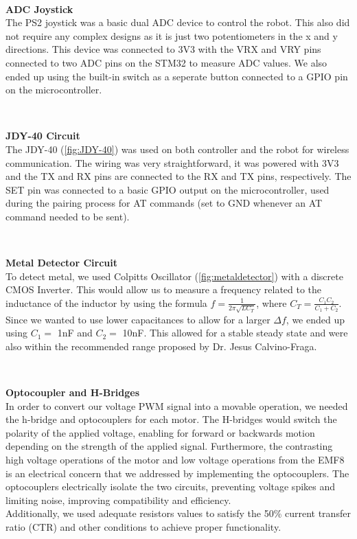\documentclass{article}
\begin{document}
\

\textbf{ADC Joystick} \\
The PS2 joystick was a basic dual ADC device to control the robot. This also did not require any complex designs as it is just two potentiometers in the x and y directions. This device was connected to 3V3 with the VRX and VRY pins connected to two ADC pins on the STM32 to measure ADC values. We also ended up using the built-in switch as a seperate button connected to a GPIO pin on the microcontroller.

\

\textbf{JDY-40 Circuit} \\
The JDY-40 (\ref{fig:JDY-40}) was used on both controller and the robot for wireless communication. The wiring was very straightforward, it was powered with 3V3 and the TX and RX pins are connected to the RX and TX pins, respectively. The SET pin was connected to a basic GPIO output on the microcontroller, used during the pairing process for AT commands (set to GND whenever an AT command needed to be sent).

\

\textbf{Metal Detector Circuit} \\
To detect metal, we used Colpitts Oscillator (\ref{fig:metaldetector}) with a discrete CMOS Inverter. This would allow us to measure a frequency related to the inductance of the inductor by using the formula $f = \frac{1}{2 \pi \sqrt{LC_T}}$, where $C_T = \frac{C_1C_2}{C_1+C_2}$. Since we wanted to use lower capacitances to allow for a larger $\Delta f$, we ended up using $C_1 =$ 1nF and $C_2 =$ 10nF. This allowed for a stable steady state and were also within the recommended range proposed by Dr. Jesus Calvino-Fraga.

\

\textbf{Optocoupler and H-Bridges} \\
In order to convert our voltage PWM signal into a movable operation, we needed the h-bridge and optocouplers for each motor. The H-bridges would switch the polarity of the applied voltage, enabling for forward or backwards motion depending on the strength of the applied signal. Furthermore, the contrasting high voltage operations of the motor and low voltage operations from the EMF8 is an electrical concern that we addressed by implementing the optocouplers. The optocouplers electrically isolate the two circuits, preventing voltage spikes and limiting noise, improving compatibility and efficiency. \\
Additionally, we used adequate resistors values to satisfy the 50\% current transfer ratio (CTR) and other conditions to achieve proper functionality.
\end{document}
